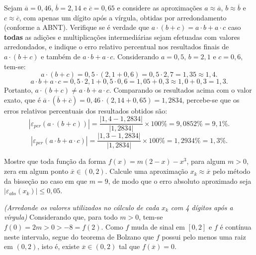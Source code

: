 \documentclass[12pt,a4paper]{article}
\begin{document}
\begin{ExerciseList}
\Exercise[title={2,5}] Sejam
$\overline{a} = 0,46$,
$\overline{b} = 2,14$ e
$\overline{c} = 0,65$ e considere as aproximações $a\approx \overline{a}$,
$b\approx \overline{b}$ e
$c\approx \overline{c}$,
com apenas um dígito após a vírgula, obtidas por arredondamento (conforme a ABNT). Verifique se é verdade que $a\cdot (b + c) = a\cdot b + a\cdot c$ caso \textbf{todas} as adições e multiplicações intermediárias sejam efetuadas com valores arredondados, e indique o erro relativo percentual nos resultados finais de $a\cdot (b + c)$ e também de $a\cdot b + a\cdot c$.
\Answer
Considerando
$a = 0,5$,
$b = 2,1$ e
$c = 0,6$, tem-se:
\[
a\cdot (b + c)
= 0,5 \cdot (2,1 + 0,6)
= 0,5 \cdot 2,7
= 1,35 \approx 1,4.
\]
\[
a\cdot b + a\cdot c
= 0,5\cdot 2,1 + 0,5\cdot 0,6
= 1,05 + 0,3
\approx 1,0 + 0,3
= 1,3.
\]
Portanto, $a\cdot (b + c) \neq a\cdot b + a\cdot c$. Comparando os resultados acima com o valor exato, que é $\overline{a}\cdot (\overline{b} + \overline{c}) = 0,46\cdot (2,14 + 0,65) = 1,2834$, percebe-se que os erros relativos percentuais dos resultados obtidos são:
\[
|\varepsilon_{per}(a\cdot (b + c))|
= \frac{|1,4-1,2834|}{|1,2834|} \times 100 \%
= 9,0852 \%
= 9,1 \%.
\]
\[
|\varepsilon_{per}(a\cdot b + a\cdot c)|
= \frac{|1,3-1,2834|}{|1,2834|} \times 100 \%
= 1,2934 \%
= 1,3 \%.
\]


\Exercise[title={2,5}] Mostre que toda função da forma $f(x) = m(2-x)-x^3$, para algum $m > 0$, zera em algum ponto $\overline{x} \in (0, 2)$. Calcule uma aproximação $x_k \approx \overline{x}$ pelo método da bisseção no caso em que $m = 9$, de modo que o erro absoluto aproximado seja $|\varepsilon_{abs}(x_k)| \leq 0,05$.

\textit{(Arredonde os valores utilizados no cálculo de cada $x_k$ com 4 dígitos após a vírgula)}
\Answer
Considerando que, para todo $m > 0$, tem-se $f(0) = 2m > 0 > -8 = f(2)$. Como $f$ muda de sinal em $[0,2]$ e $f$ é contínua neste intervalo, segue do teorema de Bolzano que $f$ possui pelo menos uma raiz em $(0,2)$, isto é, existe $\overline{x} \in (0,2)$ tal que $f(\overline{x}) = 0$.


\end{ExerciseList}
\end{document}
